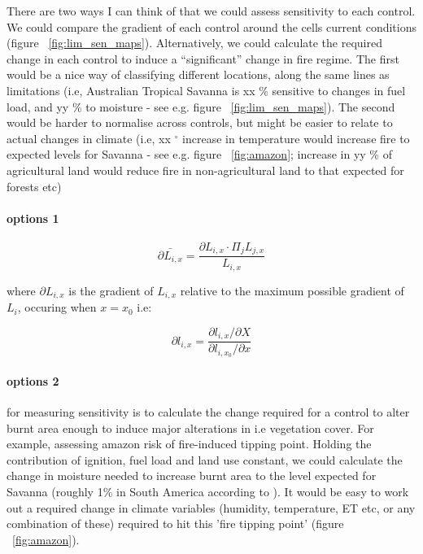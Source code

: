 \begin{shaded}
    There are two ways I can think of that we could assess sensitivity to each control. We could compare the gradient of each control around the cells current conditions (figure ~\ref{fig:lim_sen_maps}). Alternatively, we could calculate the required change in each control to induce a ``significant'' change in fire regime. The first would be a nice way of classifying different locations, along the same lines as limitations (i.e, Australian Tropical Savanna is xx \% sensitive to changes in fuel load, and yy \% to moisture - see e.g. figure ~\ref{fig:lim_sen_maps}). The second would be harder to normalise across controls, but might be easier to relate to actual changes in climate (i.e, xx $^{\circ}$ increase in temperature would increase fire to expected levels for Savanna - see e.g. figure ~\ref{fig:amazon}; increase in yy \% of agricultural land would reduce fire in non-agricultural land to that expected for forests etc)

\paragraph{options 1}

\begin{equation}
    \bar{\partial L_{i, x}} = \frac{\partial L_{i, x} \cdot \Pi_{j} L_{j, x}}{L_{i, x}}
\end{equation}

where $\partial L_{i, x}$ is the gradient of $L_{i, x}$ relative to the maximum possible gradient of $L_{i}$, occuring when $x = x_{0}$ i.e:

\begin{equation}
    \partial l_{i, x} = \frac{\partial l_{i, x} / \partial X}
                             {\partial l_{i, x_{0}} / \partial x}
\end{equation}

\paragraph{options 2}
for measuring sensitivity is to calculate the change required for a control to alter burnt area enough to induce major alterations in i.e vegetation cover.
For example, assessing amazon risk of fire-induced tipping point. Holding the contribution of ignition, fuel load and land use constant, we could calculate the change in moisture needed to increase burnt area to the level expected for Savanna (roughly 1\% in South America according to \cite{lehmann2011deciphering}).
It would be easy to work out a required change in climate variables (humidity, temperature, ET etc, or any combination of these) required to hit this 'fire tipping point' (figure ~\ref{fig:amazon}).

\end{shaded}
